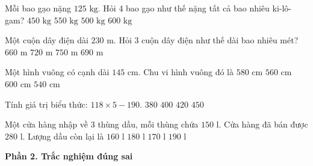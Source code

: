 \begin{ex} %
Mỗi bao gạo nặng $125\text{ kg}$. Hỏi 4 bao gạo như thế nặng tất cả bao nhiêu ki-lô-gam?
\choice
{$450\text{ kg}$}
{$550\text{ kg}$}
{\True $500\text{ kg}$}
{$600\text{ kg}$}
\end{ex}

\begin{ex} %
Một cuộn dây điện dài $230\text{ m}$. Hỏi 3 cuộn dây điện như thế dài bao nhiêu mét?
\choice
{$660\text{ m}$}
{$720\text{ m}$}
{$750\text{ m}$}
{\True $690\text{ m}$}
\end{ex}

\begin{ex} %
Một hình vuông có cạnh dài $145\text{ cm}$. Chu vi hình vuông đó là
\choice
{\True $580\text{ cm}$}
{$560\text{ cm}$}
{$600\text{ cm}$}
{$540\text{ cm}$}
\end{ex}

\begin{ex} %
Tính giá trị biểu thức: $118 \times 5 - 190$.
\choice
{$380$}
{\True $400$}
{$420$}
{$450$}
\end{ex}

\begin{ex} %
Một cửa hàng nhập về 3 thùng dầu, mỗi thùng chứa $150\text{ l}$. Cửa hàng đã bán được $280\text{ l}$. Lượng dầu còn lại là
\choice
{$160\text{ l}$}
{$180\text{ l}$}
{\True $170\text{ l}$}
{$190\text{ l}$}
\end{ex}

\textbf{Phần 2. Trắc nghiệm đúng sai}

